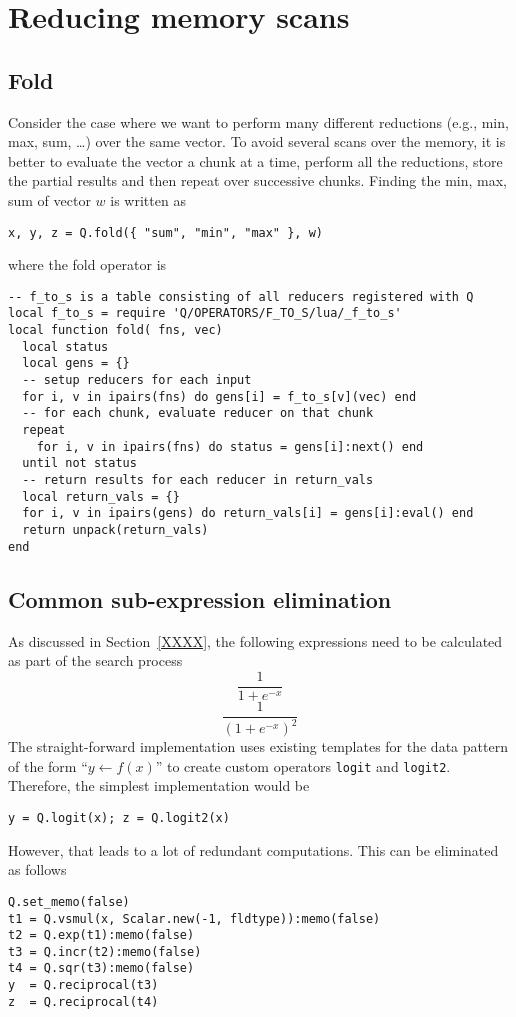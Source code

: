 \section{Reducing memory scans}

\subsection{Fold}
Consider the case where we want to perform many different reductions (e.g., min,
max, sum, \ldots) over the same vector. To avoid several scans over the memory,
it is better to evaluate the vector a chunk at a time, perform all the
reductions, store the partial results and then repeat over successive chunks.
Finding the min, max, sum of vector \(w\) is written as 
\begin{verbatim}
x, y, z = Q.fold({ "sum", "min", "max" }, w)
\end{verbatim}
where the fold operator is 
\begin{verbatim}
-- f_to_s is a table consisting of all reducers registered with Q
local f_to_s = require 'Q/OPERATORS/F_TO_S/lua/_f_to_s'
local function fold( fns, vec)
  local status
  local gens = {}
  -- setup reducers for each input 
  for i, v in ipairs(fns) do gens[i] = f_to_s[v](vec) end
  -- for each chunk, evaluate reducer on that chunk
  repeat 
    for i, v in ipairs(fns) do status = gens[i]:next() end 
  until not status
  -- return results for each reducer in return_vals
  local return_vals = {}
  for i, v in ipairs(gens) do return_vals[i] = gens[i]:eval() end
  return unpack(return_vals)
end
\end{verbatim}


\subsection{Common sub-expression elimination}

As discussed in Section~\ref{XXXX}, the following expressions need to be
calculated as part of the search process
\begin{equation}
\label{logit}
  \frac{1}{1 + e^{-x}}
\end{equation}
\begin{equation}
\label{logit2}
    \frac{1}{(1 + e^{-x})^2}
\end{equation}
The straight-forward implementation uses existing templates for the
data pattern of the form ``\(y \leftarrow f(x)\)'' to create custom
operators {\tt logit} and {\tt logit2}.  Therefore, the simplest implementation
would be
\begin{verbatim}
y = Q.logit(x); z = Q.logit2(x)
\end{verbatim}
However, that leads to a lot
of redundant computations.  This can be eliminated as follows
\begin{verbatim}
Q.set_memo(false)
t1 = Q.vsmul(x, Scalar.new(-1, fldtype)):memo(false)
t2 = Q.exp(t1):memo(false)
t3 = Q.incr(t2):memo(false)
t4 = Q.sqr(t3):memo(false)
y  = Q.reciprocal(t3)
z  = Q.reciprocal(t4)
\end{verbatim}

